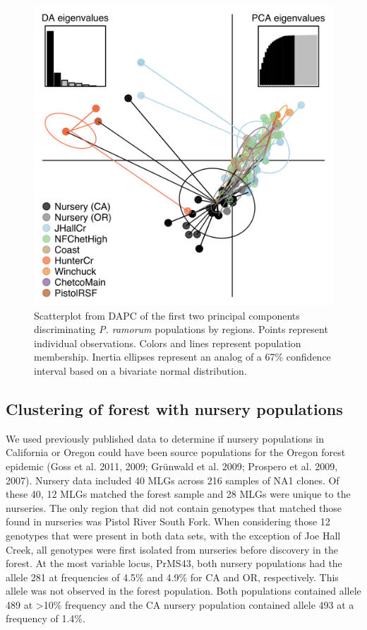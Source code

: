 \documentclass[double,12pt]{beavtex}
\begin{document}
  \begin{figure}
  
  {\centering \includegraphics[width=0.8\linewidth]{figure/phytopathology/figure_4} 
  
  }
  
  \caption[Scatterplot from DAPC of the first two principal components
  discriminating \emph{P. ramorum} populations by regions.]{Scatterplot from DAPC of the first two principal components
  discriminating \emph{P. ramorum} populations by regions. Points
  represent individual observations. Colors and lines represent population
  membership. Inertia ellipses represent an analog of a 67\% confidence
  interval based on a bivariate normal distribution.}\label{fig:ramfig4}
  \end{figure}
  
  \newpage
  
  \subsection{Clustering of forest with nursery
  populations}\label{clustering-of-forest-with-nursery-populations}
  
  We used previously published data to determine if nursery populations in
  California or Oregon could have been source populations for the Oregon
  forest epidemic (Goss et al. 2011, 2009; Grünwald et al. 2009; Prospero
  et al. 2009, 2007). Nursery data included 40 MLGs across 216 samples of
  NA1 clones. Of these 40, 12 MLGs matched the forest sample and 28 MLGs
  were unique to the nurseries. The only region that did not contain
  genotypes that matched those found in nurseries was Pistol River South
  Fork. When considering those 12 genotypes that were present in both data
  sets, with the exception of Joe Hall Creek, all genotypes were first
  isolated from nurseries before discovery in the forest. At the most
  variable locus, PrMS43, both nursery populations had the allele 281 at
  frequencies of 4.5\% and 4.9\% for CA and OR, respectively. This allele
  was not observed in the forest population. Both populations contained
  allele 489 at \textgreater{}10\% frequency and the CA nursery population
  contained allele 493 at a frequency of 1.4\%.
  
\end{document}
